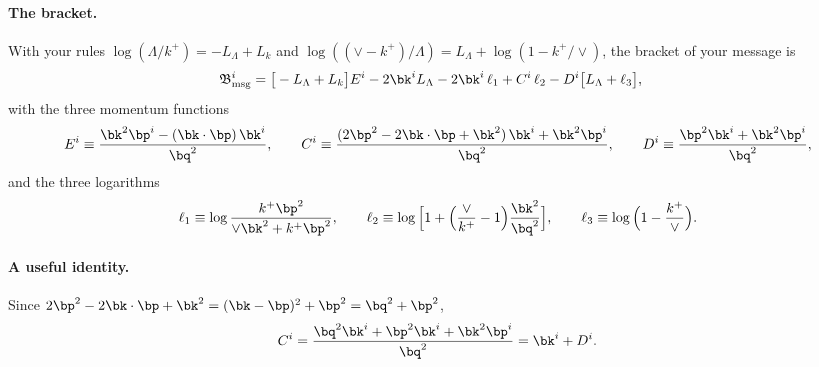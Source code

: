 \paragraph{The bracket.} With your rules $\log(\Lambda/k^+)=-L_\Lambda+L_k$ and $\log((\vee-k^+)/\Lambda)=L_\Lambda+\log(1-k^+/\vee)$, the bracket of your message is
\begin{align}
\mathfrak B^i_{\rm msg}={}&\big[-L_\Lambda+L_k\big]E^i-2\bk^iL_\Lambda-2\bk^i\,\ell_1+C^i\,\ell_2-D^i\big[L_\Lambda+\ell_3\big],
\label{eq:Bmsg}
\end{align}
with the three momentum functions
\begin{equation}
E^i\equiv\frac{\bk^2\bp^i-(\bk\cdot\bp)\,\bk^i}{\bq^2},\qquad
C^i\equiv\frac{(2\bp^2-2\bk\cdot\bp+\bk^2)\,\bk^i+\bk^2\bp^i}{\bq^2},\qquad
D^i\equiv\frac{\bp^2\bk^i+\bk^2\bp^i}{\bq^2},
\label{eq:ECD}
\end{equation}
and the three logarithms
\begin{equation}
\ell_1\equiv\log\frac{k^+\bp^2}{\vee\bk^2+k^+\bp^2},\qquad
\ell_2\equiv\log\Big[1+\Big(\frac{\vee}{k^+}-1\Big)\frac{\bk^2}{\bq^2}\Big],\qquad
\ell_3\equiv\log\Big(1-\frac{k^+}{\vee}\Big).
\end{equation}
\paragraph{A useful identity.} Since $2\bp^2-2\bk\cdot\bp+\bk^2=(\bk-\bp)^2+\bp^2=\bq^2+\bp^2$,
\begin{equation}
C^i=\frac{\bq^2\bk^i+\bp^2\bk^i+\bk^2\bp^i}{\bq^2}=\bk^i+D^i .
\label{eq:CD}
\end{equation}

